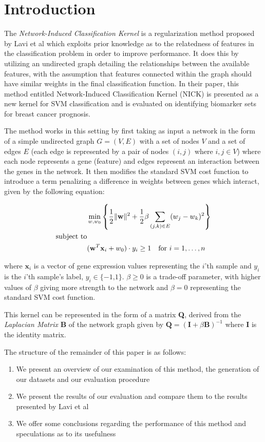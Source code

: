 \section{Introduction}

The \textit{Network-Induced Classification Kernel} is a regularization method proposed by Lavi et al\cite{Lavi2012} which exploits prior knowledge as to the relatedness of features in the classification problem in order to improve performance.  It does this by utilizing an undirected graph detailing the relationships between the available features, with the assumption that features connected within the graph should have similar weights in the final classification function.  In their paper, this method entitled Network-Induced Classification Kernel (NICK) is presented as a new kernel for SVM classification and is evaluated on identifying biomarker sets for breast cancer prognosis.
	
The method works in this setting by first taking as input a network in the form of a simple
undirected graph $G = (V, E)$ with a set of nodes $V$ and a set of edges $E$ (each edge is represented by a pair of nodes $(i, j)$ where $i, j \in V$) where each node represents a gene (feature) and edges represent an interaction between the genes in the network. It then modifies the standard SVM cost function to introduce a term penalizing a difference in weights between genes which interact, given by the following equation:

\begin{align*}
	& \min_{w,w_0}
	  \left\lbrace 
	  \frac{1}{2}\|\textbf{w}\|^2 + 
	  \frac{1}{2}\beta \sum_{(j,k) \in E} (w_j - w_k)^2 
	  \right\rbrace \\
	\text{subject to} \hfill \\
	& (\textbf{w}^T\textbf{x}_i + w_0) \cdot y_i \geq 1 \quad \text{for } i = 1, \ldots , n
\end{align*}

\noindent where $\textbf{x}_i$ is a vector of gene expression values representing the $i$’th sample and $y_i$ is the $i$’th sample’s label, $y_i \in \{ - 1‚ 1 \}$. $\beta \geq 0$ is a trade-off parameter, with higher values of $\beta$ giving more strength to the network and $\beta = 0$ representing the standard SVM cost function.

This kernel can be represented in the form of a matrix \textbf{Q}, derived from the \textit{Laplacian Matrix} \textbf{B} of the network graph given by $\textbf{Q} = (\textbf{I} + \beta\textbf{B})^{-1}$ where \textbf{I} is the identity matrix.

The structure of the remainder of this paper is as follows:
\begin{enumerate}
	\item We present an overview of our examination of this method, the generation of our datasets and our evaluation procedure
	\item We present the results of our evaluation and compare them to the results presented by Lavi et al
	\item We offer some conclusions regarding the performance of this method and speculations as to its usefulness
\end{enumerate}